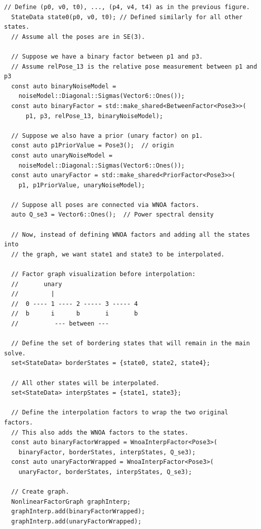 \documentclass[border=1pt]{standalone}
\begin{document}
\begin{listingbox}
\begin{lstlisting}[style=C++Style]
  // Define (p0, v0, t0), ..., (p4, v4, t4) as in the previous figure.
  StateData state0(p0, v0, t0); // Defined similarly for all other states.
  // Assume all the poses are in SE(3).
  
  // Suppose we have a binary factor between p1 and p3. 
  // Assume relPose_13 is the relative pose measurement between p1 and p3
  const auto binaryNoiseModel = 
    noiseModel::Diagonal::Sigmas(Vector6::Ones());
  const auto binaryFactor = std::make_shared<BetweenFactor<Pose3>>(
      p1, p3, relPose_13, binaryNoiseModel);
  
  // Suppose we also have a prior (unary factor) on p1.
  const auto p1PriorValue = Pose3();  // origin
  const auto unaryNoiseModel = 
    noiseModel::Diagonal::Sigmas(Vector6::Ones());
  const auto unaryFactor = std::make_shared<PriorFactor<Pose3>>(
    p1, p1PriorValue, unaryNoiseModel);
  
  // Suppose all poses are connected via WNOA factors.
  auto Q_se3 = Vector6::Ones();  // Power spectral density
  
  // Now, instead of defining WNOA factors and adding all the states into
  // the graph, we want state1 and state3 to be interpolated.
  
  // Factor graph visualization before interpolation:
  //       unary
  //         |
  //  0 ---- 1 ---- 2 ----- 3 ----- 4
  //  b      i      b       i       b
  //          --- between ---
  
  // Define the set of bordering states that will remain in the main solve.
  set<StateData> borderStates = {state0, state2, state4};
  
  // All other states will be interpolated.
  set<StateData> interpStates = {state1, state3};
  
  // Define the interpolation factors to wrap the two original factors.
  // This also adds the WNOA factors to the states.
  const auto binaryFactorWrapped = WnoaInterpFactor<Pose3>(
    binaryFactor, borderStates, interpStates, Q_se3);
  const auto unaryFactorWrapped = WnoaInterpFactor<Pose3>(
    unaryFactor, borderStates, interpStates, Q_se3);

  // Create graph.
  NonlinearFactorGraph graphInterp;
  graphInterp.add(binaryFactorWrapped);
  graphInterp.add(unaryFactorWrapped);
  

\end{lstlisting}
\end{listingbox}
\end{document}
